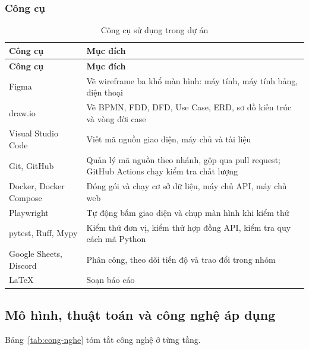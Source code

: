 \subsubsection{Công cụ}

{\small
\renewcommand{\arraystretch}{1.25}
\begin{longtable}{|>{\raggedright\arraybackslash}p{3.4cm}|>{\raggedright\arraybackslash}p{11.4cm}|}
\caption{Công cụ sử dụng trong dự án}\label{tab:cong-cu}\\ \hline
\textbf{Công cụ} & \textbf{Mục đích} \\ \hline \endfirsthead
\hline \textbf{Công cụ} & \textbf{Mục đích} \\ \hline \endhead
Figma & Vẽ wireframe ba khổ màn hình: máy tính, máy tính bảng, điện thoại \\ \hline
draw.io & Vẽ BPMN, FDD, DFD, Use Case, ERD, sơ đồ kiến trúc và vòng đời case \\ \hline
Visual Studio Code & Viết mã nguồn giao diện, máy chủ và tài liệu \\ \hline
Git, GitHub & Quản lý mã nguồn theo nhánh, gộp qua pull request; GitHub Actions chạy kiểm tra chất lượng \\ \hline
Docker, Docker Compose & Đóng gói và chạy cơ sở dữ liệu, máy chủ API, máy chủ web \\ \hline
Playwright & Tự động bấm giao diện và chụp màn hình khi kiểm thử \\ \hline
pytest, Ruff, Mypy & Kiểm thử đơn vị, kiểm thử hợp đồng API, kiểm tra quy cách mã Python \\ \hline
Google Sheets, Discord & Phân công, theo dõi tiến độ và trao đổi trong nhóm \\ \hline
LaTeX & Soạn báo cáo \\ \hline
\end{longtable}
}

\subsection{Mô hình, thuật toán và công nghệ áp dụng}

Bảng~\ref{tab:cong-nghe} tóm tắt công nghệ ở từng tầng.

